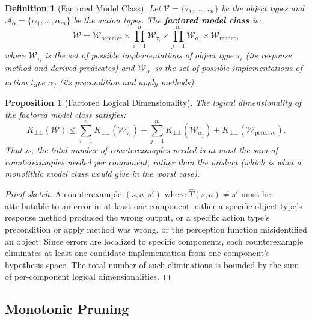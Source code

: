 \documentclass{article}
\newtheorem{definition}{Definition}
\newtheorem{proposition}{Proposition}
\newcommand{\calA}{\mathcal{A}}
\newcommand{\calV}{\mathcal{V}}
\newcommand{\calW}{\mathcal{W}}
\begin{document}
\begin{definition}[Factored Model Class]
\label{def:factored_class}
Let $\calV = \{\tau_1, \ldots, \tau_n\}$ be the object types and
$\calA_\alpha = \{\alpha_1, \ldots, \alpha_m\}$ be the action types.  The
\textbf{factored model class} is:
\begin{equation}
\calW = \calW_{\text{perceive}} \times
        \prod_{i=1}^{n} \calW_{\tau_i} \times
        \prod_{j=1}^{m} \calW_{\alpha_j} \times
        \calW_{\text{render}},
\end{equation}
where $\calW_{\tau_i}$ is the set of possible implementations of object type
$\tau_i$ (its response method and derived predicates) and $\calW_{\alpha_j}$
is the set of possible implementations of action type $\alpha_j$ (its
precondition and apply methods).
\end{definition}

\begin{proposition}[Factored Logical Dimensionality]
\label{prop:factored_dim}
The logical dimensionality of the factored model class satisfies:
\begin{equation}
K_{\bot\!\!\bot}(\calW) \leq \sum_{i=1}^{n} K_{\bot\!\!\bot}(\calW_{\tau_i})
    + \sum_{j=1}^{m} K_{\bot\!\!\bot}(\calW_{\alpha_j})
    + K_{\bot\!\!\bot}(\calW_{\text{perceive}}).
\end{equation}
That is, the total number of counterexamples needed is at most the sum of
counterexamples needed per component, rather than the product (which is what
a monolithic model class would give in the worst case).
\end{proposition}

\begin{proof}[Proof sketch]
A counterexample $(s, a, s')$ where $\hat{T}(s,a) \neq s'$ must be
attributable to an error in at least one component: either a specific object
type's response method produced the wrong output, or a specific action type's
precondition or apply method was wrong, or the perception function
misidentified an object.  Since errors are localized to specific components,
each counterexample eliminates at least one candidate implementation from one
component's hypothesis space.  The total number of such eliminations is bounded
by the sum of per-component logical dimensionalities.
\end{proof}

\subsection{Monotonic Pruning}
\label{sec:pruning}
\end{document}
